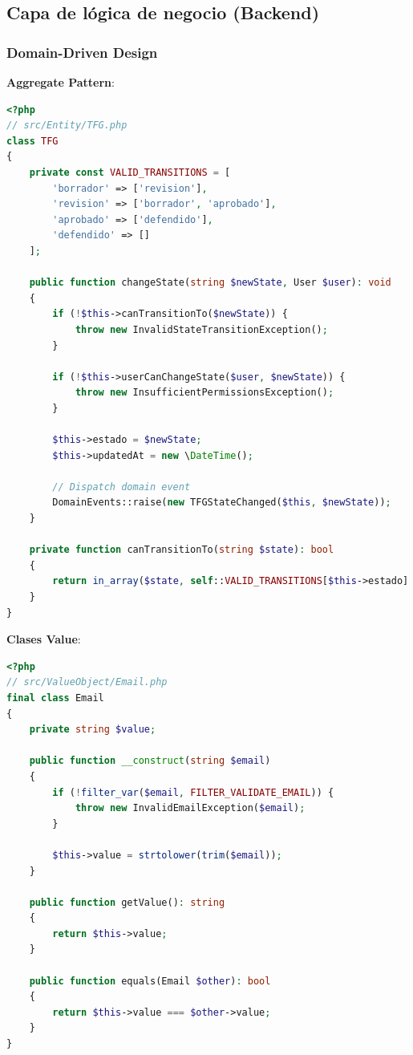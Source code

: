 \documentclass[12pt,a4paper,oneside]{report}
\begin{document}
\subsection{Capa de lógica de negocio
(Backend)}\label{capa-de-luxf3gica-de-negocio-backend}

\subsubsection{Domain-Driven Design}\label{domain-driven-design}

\textbf{Aggregate Pattern}:

\begin{lstlisting}[language=PHP]
<?php
// src/Entity/TFG.php
class TFG
{
    private const VALID_TRANSITIONS = [
        'borrador' => ['revision'],
        'revision' => ['borrador', 'aprobado'],
        'aprobado' => ['defendido'],
        'defendido' => []
    ];
    
    public function changeState(string $newState, User $user): void
    {
        if (!$this->canTransitionTo($newState)) {
            throw new InvalidStateTransitionException();
        }
        
        if (!$this->userCanChangeState($user, $newState)) {
            throw new InsufficientPermissionsException();
        }
        
        $this->estado = $newState;
        $this->updatedAt = new \DateTime();
        
        // Dispatch domain event
        DomainEvents::raise(new TFGStateChanged($this, $newState));
    }
    
    private function canTransitionTo(string $state): bool
    {
        return in_array($state, self::VALID_TRANSITIONS[$this->estado] ?? []);
    }
}
\end{lstlisting}

\textbf{Clases Value}:

\begin{lstlisting}[language=PHP]
<?php
// src/ValueObject/Email.php
final class Email
{
    private string $value;
    
    public function __construct(string $email)
    {
        if (!filter_var($email, FILTER_VALIDATE_EMAIL)) {
            throw new InvalidEmailException($email);
        }
        
        $this->value = strtolower(trim($email));
    }
    
    public function getValue(): string
    {
        return $this->value;
    }
    
    public function equals(Email $other): bool
    {
        return $this->value === $other->value;
    }
}
\end{lstlisting}
\end{document}
